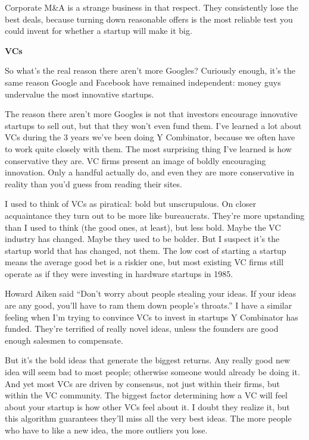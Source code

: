Corporate M\&A is a strange business in that respect. They consistently
lose the best deals, because turning down reasonable offers is the most
reliable test you could invent for whether a startup will make it big.

\textbf{VCs}

So what's the real reason there aren't more Googles? Curiously enough,
it's the same reason Google and Facebook have remained independent:
money guys undervalue the most innovative startups.

The reason there aren't more Googles is not that investors encourage
innovative startups to sell out, but that they won't even fund them.
I've learned a lot about VCs during the 3 years we've been doing Y
Combinator, because we often have to work quite closely with them. The
most surprising thing I've learned is how conservative they are. VC
firms present an image of boldly encouraging innovation. Only a handful
actually do, and even they are more conservative in reality than you'd
guess from reading their sites.

I used to think of VCs as piratical: bold but unscrupulous. On closer
acquaintance they turn out to be more like bureaucrats. They're more
upstanding than I used to think (the good ones, at least), but less
bold. Maybe the VC industry has changed. Maybe they used to be bolder.
But I suspect it's the startup world that has changed, not them. The low
cost of starting a startup means the average good bet is a riskier one,
but most existing VC firms still operate as if they were investing in
hardware startups in 1985.

Howard Aiken said ``Don't worry about people stealing your ideas. If
your ideas are any good, you'll have to ram them down people's
throats.'' I have a similar feeling when I'm trying to convince VCs to
invest in startups Y Combinator has funded. They're terrified of really
novel ideas, unless the founders are good enough salesmen to compensate.

But it's the bold ideas that generate the biggest returns. Any really
good new idea will seem bad to most people; otherwise someone would
already be doing it. And yet most VCs are driven by consensus, not just
within their firms, but within the VC community. The biggest factor
determining how a VC will feel about your startup is how other VCs feel
about it. I doubt they realize it, but this algorithm guarantees they'll
miss all the very best ideas. The more people who have to like a new
idea, the more outliers you lose.

